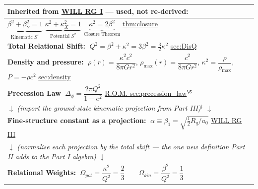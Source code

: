 \begin{tcolorbox}[colback=gray!5, colframe=black!80!black,
                  title=Derivation Chain Map --- WILL RG II (A): Inherited Core and Stage I]
\begin{center}
\renewcommand{\arraystretch}{1.3}
\begin{tabular}{|>{\centering\arraybackslash}p{}|}
\hline

\textbf{Inherited from \href{https://willrg.com/documents/WILL_RG_I.pdf#sec:foundational}{WILL RG I} --- used, not re-derived:}\\[2pt]\hline
$\underbrace{\beta^{2}+\beta_{Y}^{2}=1}_{\text{Kinematic }S^{1}}$ \qquad
$\underbrace{\kappa^{2}+\kappa_{X}^{2}=1}_{\text{Potential }S^{2}}$ \qquad
$\underbrace{\kappa^{2}=2\beta^{2}}_{\text{Closure Theorem}}$
\quad \href{https://willrg.com/documents/WILL_RG_I.pdf#thm:closure}{thm:closure}\\[8pt]\hline
\textbf{Total Relational Shift:} $\;Q^{2}=\beta^{2}+\kappa^{2}=3\beta^{2}=\tfrac{3}{2}\kappa^{2}$
\quad \href{https://willrg.com/documents/WILL_RG_I.pdf#sec:DisQ}{sec:DisQ}\\[2pt]\hline
\textbf{Density and pressure:} $\;\rho(r)=\dfrac{\kappa^{2}c^{2}}{8\pi Gr^{2}}$, \quad
$\rho_{\max}(r)=\dfrac{c^{2}}{8\pi Gr^{2}}$, \quad
$\kappa^{2}=\dfrac{\rho}{\rho_{\max}}$, \quad $P=-\rho c^{2}$
\quad \href{https://willrg.com/documents/WILL_RG_I.pdf#sec:density}{sec:density}\\[8pt]\hline
\textbf{Precession Law} $\;\Delta_{\phi}=\dfrac{2\pi Q^{2}}{1-e^{2}}$
\quad \href{https://willrg.com/documents/WILL_RG_R.O.M..pdf#sec:precession_law}{R.O.M. sec:precession\_law}$^{\S}$\\[6pt]\hline

$\downarrow$ \textit{(import the ground-state kinematic projection from Part III)}$^{\ddagger}$ $\downarrow$\\\hline
\textbf{Fine-structure constant as a projection:} $\;\alpha\equiv\beta_{1}=\sqrt{\tfrac{1}{2}R_{q}/a_{0}}$
\quad \href{https://willrg.com/documents/WILL_RG_III.pdf#eq:beta=alpha}{WILL RG III}\\[4pt]\hline

$\downarrow$ \textit{(normalise each projection by the total shift --- the one new definition Part II adds to the Part I algebra)} $\downarrow$\\\hline
\textbf{Relational Weights:} $\;\boxed{\Omega_{pot}=\dfrac{\kappa^{2}}{Q^{2}}=\dfrac{2}{3}}\qquad
\boxed{\Omega_{kin}=\dfrac{\beta^{2}}{Q^{2}}=\dfrac{1}{3}}$\\[8pt]\hline


\end{tabular}
\end{center}
\end{tcolorbox}
